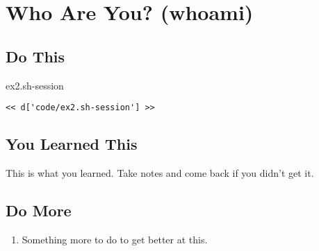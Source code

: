 \chapter{Who Are You? (whoami)}

\section{Do This}

\begin{code}{ex2.sh-session}
\begin{Verbatim}
<< d['code/ex2.sh-session'] >>
\end{Verbatim}
\end{code}


\section{You Learned This}

This is what you learned.  Take notes and come back if you didn't get it.

\section{Do More}

\begin{enumerate}
\item Something more to do to get better at this.
\end{enumerate}

